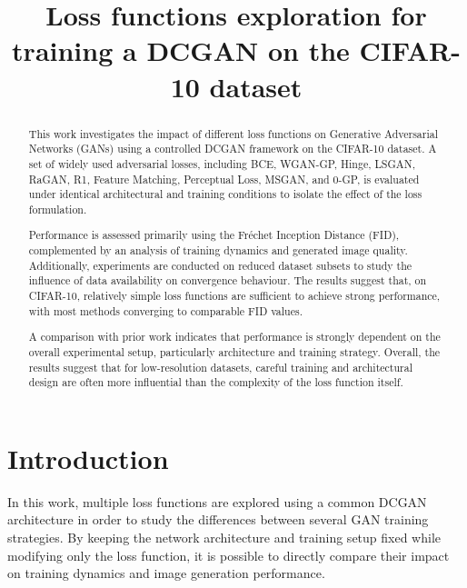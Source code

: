 \documentclass[conference]{IEEEtran}
\begin{document}
\title{
Loss functions exploration for training a DCGAN on the CIFAR-10 dataset
}

\author{
}

\maketitle

\begin{abstract}

This work investigates the impact of different loss functions on Generative Adversarial Networks (GANs) using a controlled DCGAN framework on the CIFAR-10 dataset. A set of widely used adversarial losses, including BCE, WGAN-GP, Hinge, LSGAN, RaGAN, R1, Feature Matching, Perceptual Loss, MSGAN, and 0-GP, is evaluated under identical architectural and training conditions to isolate the effect of the loss formulation.

Performance is assessed primarily using the Fréchet Inception Distance (FID), complemented by an analysis of training dynamics and generated image quality. Additionally, experiments are conducted on reduced dataset subsets to study the influence of data availability on convergence behaviour. The results suggest that, on CIFAR-10, relatively simple loss functions are sufficient to achieve strong performance, with most methods converging to comparable FID values.

A comparison with prior work indicates that performance is strongly dependent on the overall experimental setup, particularly architecture and training strategy. Overall, the results suggest that for low-resolution datasets, careful training and architectural design are often more influential than the complexity of the loss function itself.

\end{abstract}



\section{Introduction}

In this work, multiple loss functions are explored using a common DCGAN architecture in order to study the differences between several GAN training strategies. By keeping the network architecture and training setup fixed while modifying only the loss function, it is possible to directly compare their impact on training dynamics and image generation performance.
\end{document}
